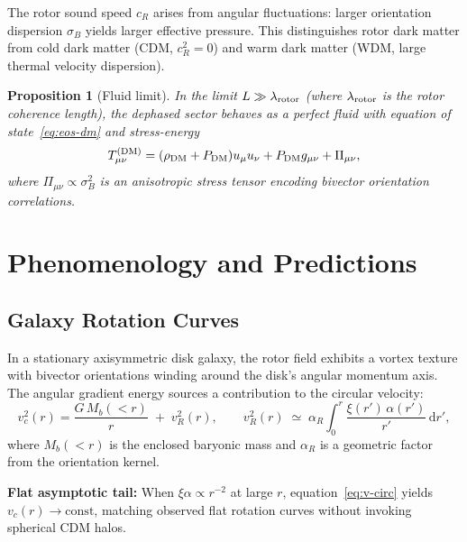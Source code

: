 \documentclass[11pt,a4paper]{article}
\numberwithin{equation}{section}
\theoremstyle{plain}
\newtheorem{proposition}[theorem]{Proposition}
\theoremstyle{definition}
\theoremstyle{remark}
\newcommand{\dd}{\mathrm{d}}
\begin{document}
The rotor sound speed $c_R$ arises from angular fluctuations: larger orientation dispersion $\sigma_B$ yields larger effective pressure. This distinguishes rotor dark matter from cold dark matter (CDM, $c_R^2=0$) and warm dark matter (WDM, large thermal velocity dispersion).

\begin{proposition}[Fluid limit]
In the limit $L\gg \lambda_{\rm rotor}$ (where $\lambda_{\rm rotor}$ is the rotor coherence length), the dephased sector behaves as a perfect fluid with equation of state~\eqref{eq:eos-dm} and stress-energy
\begin{equation}
T^{(\rm DM)}_{\mu\nu}=(\rho_{\rm DM}+P_{\rm DM})u_\mu u_\nu + P_{\rm DM} g_{\mu\nu} + \Pi_{\mu\nu},
\label{eq:T-fluid}
\end{equation}
where $\Pi_{\mu\nu}\propto \sigma_B^2$ is an anisotropic stress tensor encoding bivector orientation correlations.
\end{proposition}

\vspace{1em}

\section{Phenomenology and Predictions}\label{sec:pheno}

\subsection{Galaxy Rotation Curves}

In a stationary axisymmetric disk galaxy, the rotor field exhibits a vortex texture with bivector orientations winding around the disk's angular momentum axis. The angular gradient energy sources a contribution to the circular velocity:
\begin{equation}
v_c^2(r)=\frac{G\,M_b(<r)}{r}\;+\; v_R^2(r),
\qquad
v_R^2(r)\;\simeq\; \alpha_R \int_0^r \frac{\xi(r')\,\alpha(r')}{r'}\,\dd r',
\label{eq:v-circ}
\end{equation}
where $M_b(<r)$ is the enclosed baryonic mass and $\alpha_R$ is a geometric factor from the orientation kernel.

\textbf{Flat asymptotic tail:} When $\xi\alpha\propto r^{-2}$ at large $r$, equation~\eqref{eq:v-circ} yields $v_c(r)\to\text{const}$, matching observed flat rotation curves without invoking spherical CDM halos.
\end{document}
